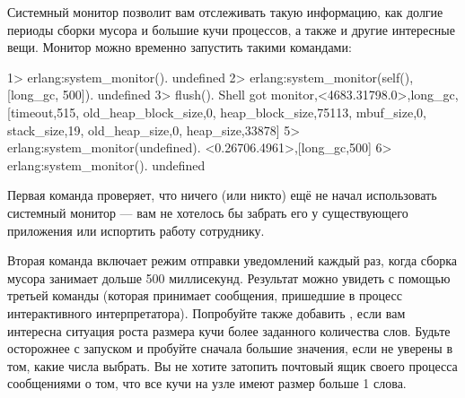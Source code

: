 \documentclass[11pt, oneside]{book}   	%
\begin{document}
Системный монитор позволит вам отслеживать такую информацию, как долгие периоды сборки мусора и большие кучи процессов, а также и другие интересные вещи. Монитор можно временно запустить такими командами:

\begin{VerbatimEshell}
1> erlang:system_monitor().
undefined
2> erlang:system_monitor(self(), [{long_gc, 500}]).
undefined
3> flush().
Shell got {monitor,<4683.31798.0>,long_gc,
                   [{timeout,515},
                    {old_heap_block_size,0},
                    {heap_block_size,75113},
                    {mbuf_size,0},
                    {stack_size,19},
                    {old_heap_size,0},
                    {heap_size,33878}]}
5> erlang:system_monitor(undefined).
{<0.26706.4961>,[{long_gc,500}]}
6> erlang:system_monitor().
undefined
\end{VerbatimEshell}

Первая команда проверяет, что ничего (или никто) ещё не начал использовать системный монитор --- вам не хотелось бы забрать его у существующего приложения или испортить работу сотруднику.

Вторая команда включает режим отправки уведомлений каждый раз, когда сборка мусора занимает дольше 500 миллисекунд. Результат можно увидеть с помощью третьей команды (которая принимает сообщения, пришедшие в процесс интерактивного интерпретатора). Попробуйте также добавить , если вам интересна ситуация роста размера кучи более заданного количества слов.
Будьте осторожнее с запуском и пробуйте сначала большие значения, если не уверены в том, какие числа выбрать. Вы не хотите затопить почтовый ящик своего процесса сообщениями о том, что все кучи на узле имеют размер больше 1 слова.
\end{document}
